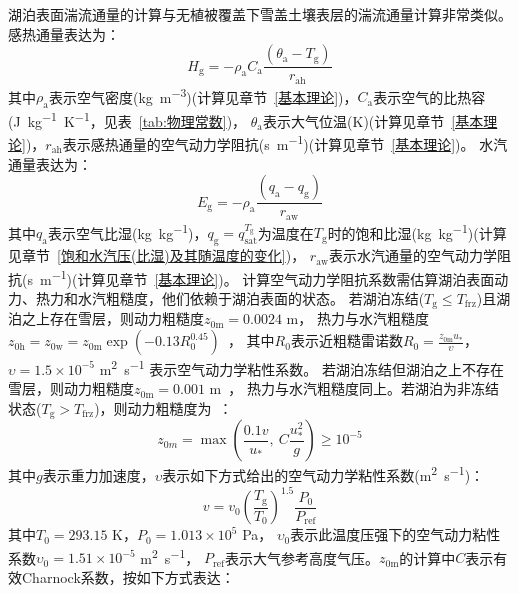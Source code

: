 湖泊表面湍流通量的计算与无植被覆盖下雪盖土壤表层的湍流通量计算非常类似。感热通量表达为：
\begin{equation}
  H_{\mathrm{g}}=-\rho_{\mathrm{a}} C_{\mathrm{ a}} \frac{\left(\theta_{\mathrm{a}}-T_{\mathrm{g}}\right)}{r_{\mathrm{a h}}}
\end{equation}
其中$\rho_{\mathrm{a}}$表示空气密度(\unit{kg.m^{-3}})(计算见章节~\ref{基本理论})，$C_{\mathrm{a}}$表示空气的比热容(\unit{J.kg^{-1}.K^{-1}}，见表~\ref{tab:物理常数})，
$\theta_{\mathrm{a}}$表示大气位温(K)(计算见章节~\ref{基本理论})，$r_{\mathrm{ah}}$表示感热通量的空气动力学阻抗(\unit{s.m^{-1}})(计算见章节~\ref{基本理论})。
水汽通量表达为：
\begin{equation}
  E_{\mathrm{g}}=-\rho_{\mathrm{a}} \frac{\left(q_{\mathrm{a}}-q_{\mathrm{g}}\right)}{r_{\mathrm{a w}}}
\end{equation}
其中$q_{\mathrm{a}}$表示空气比湿(\unit{kg.kg^{-1}})，$q_{\mathrm {g}} =q_{\mathrm{sat}}^{T_{\mathrm {g}} }$为温度在$T_{\mathrm {g}} $时的饱和比湿(\unit{kg.kg^{-1}})(计算见章节~\ref{饱和水汽压(比湿)及其随温度的变化})，
$r_{\mathrm{aw}}$表示水汽通量的空气动力学阻抗(\unit{s.m^{-1}})(计算见章节~\ref{基本理论})。
计算空气动力学阻抗系数需估算湖泊表面动力、热力和水汽粗糙度，他们依赖于湖泊表面的状态。
若湖泊冻结($T_{\mathrm {g}} \leqslant T_{\mathrm {frz}} $)且湖泊之上存在雪层，则动力粗糙度$z_{\mathrm{0m}}=0.0024$ m，
热力与水汽粗糙度$z_{\mathrm{0h}}=z_{\mathrm{0w}}=z_{\mathrm{0m}}\exp{\left(-0.13R_0^{0.45}\right)}$~\citep{zilitinkevich1972dynamics}，
其中$R_0$表示近粗糙雷诺数$R_0=\frac{z_{\mathrm{0m}}u_\ast}{\upsilon}$，
$\upsilon=1.5\times{10}^{-5}$ \unit{m^2.s^{-1}} 表示空气动力学粘性系数。
若湖泊冻结但湖泊之上不存在雪层，则动力粗糙度$z_{\mathrm{0m}}=0.001$ m~\citep{subin2012improved}，
热力与水汽粗糙度同上。若湖泊为非冻结状态($T_{\mathrm {g}} >T_{\mathrm {frz}} $)，则动力粗糙度为~\citep{subin2012improved}：
\begin{equation}
  z_{0 m}=\max \left(\frac{0.1 v}{u_{*}},\ C \frac{u_{*}^{2}}{g}\right) \geqslant 10^{-5}
\end{equation}
其中$g$表示重力加速度，$\upsilon$表示如下方式给出的空气动力学粘性系数(\unit{m^2.s^{-1}})：
\begin{equation}
  v=v_{0}\left(\frac{T_{\mathrm{g}}}{T_{0}}\right)^{1.5} \frac{P_{0}}{P_{\mathrm{r e f}}}
\end{equation}
其中$T_0=293.15$ K，$P_0=1.013\times{10}^5$ Pa，
$\upsilon_0$表示此温度压强下的空气动力粘性系数$\upsilon_0=1.51\times{10}^{-5}$ \unit{m^2.s^{-1}}，
$P_{\mathrm{ref}}$表示大气参考高度气压。$z_{\mathrm{0m}}$的计算中$C$表示有效Charnock系数，按如下方式表达：
